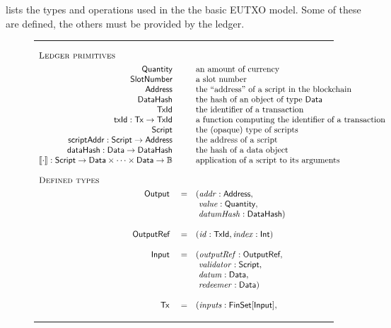 \documentclass[a4paper]{article}
\newcommand{\s}{\textsf}  %
\newcommand{\msf}[1]{\ensuremath{\mathsf{#1}}}
\newcommand{\mi}[1]{\ensuremath{\mathit{#1}}}
\newcommand\rfskip{7pt}
\newenvironment{ruledfigure}[1]{\begin{figure}[#1]\hrule\vspace{\rfskip}}{\vspace{\rfskip}\hrule\end{figure}}
\newcommand{\FinSet}[1]{\ensuremath{\s{FinSet}[#1]}}
\newcommand{\script}{\ensuremath{\s{Script}}}
\newcommand{\scriptAddr}{\msf{scriptAddr}}
\newcommand{\TxId}{\ensuremath{\s{TxId}}}
\newcommand{\txId}{\msf{txId}}
\newcommand{\txrefid}{\mi{id}}
\newcommand{\Address}{\ensuremath{\s{Address}}}
\newcommand{\DataHash}{\ensuremath{\s{DataHash}}}
\newcommand{\hashData}{\msf{dataHash}}
\newcommand{\idx}{\mi{index}}
\newcommand{\inputs}{\mi{inputs}}
\newcommand{\addr}{\mi{addr}}
\newcommand{\val}{\mi{value}}  %
\newcommand{\validator}{\mi{validator}}
\newcommand{\redeemer}{\mi{redeemer}}
\newcommand{\datum}{\mi{datum}}
\newcommand{\datumHash}{\mi{datumHash}}
\newcommand{\Data}{\ensuremath{\s{Data}}}
\newcommand{\outputref}{\mi{outputRef}}
\newcommand{\slotnum}{\ensuremath{\s{SlotNumber}}}
\newcommand{\eutxotx}{\msf{Tx}}
\newcommand{\qty}{\ensuremath{\s{Quantity}}}
\newcommand{\applyScript}[1]{\ensuremath{\llbracket#1\rrbracket}}
\newcommand\B{\ensuremath{\mathbb{B}}}
\begin{document}
 lists the types and operations used in the
the basic EUTXO model. Some of these are defined, the others must be provided by
the ledger.
\begin{ruledfigure}{H}
  \begin{displaymath}
  \begin{array}{rll}
    \multicolumn{3}{l}{\textsc{Ledger primitives}}\\[4pt]
    \qty{} && \mbox{an amount of currency}\\
    \slotnum && \mbox{a slot number}\\
    \Address && \mbox{the ``address'' of a script in the blockchain}\\
    \DataHash && \mbox{the hash of an object of type \Data{}}\\
    \TxId && \mbox{the identifier of a transaction}\\
    \txId : \eutxotx \rightarrow \TxId && \mbox{a function computing the identifier of a transaction}\\
    \script && \mbox{the (opaque) type of scripts}\\
    \scriptAddr : \script \rightarrow \Address && \mbox{the address of a script}\\
    \hashData : \Data \rightarrow \DataHash && \mbox{the hash of a data object}\\
    \applyScript{\cdot}: \script \rightarrow \Data \times \cdots \times
    \Data \rightarrow \B && \mbox{application of a script to its arguments}\\
    \\
    \multicolumn{3}{l}{\textsc{Defined types}}\\[4pt]
    \s{Output } &=&(\addr: \Address,\\
                & &\ \val: \qty,\\
                & &\ \datumHash: \DataHash)\\
    \\
    \s{OutputRef } &=&(\txrefid: \TxId, \idx: \s{Int})\\
    \\
    \s{Input } &=&(\outputref: \s{OutputRef},\\
               & &\ \validator: \script,\\
               & &\ \datum: \Data,\\
               & &\ \redeemer: \Data)\\
     \\
     \eutxotx\s{ } &=&(\inputs: \FinSet{\s{Input}},\\

\end{array}
\end{displaymath}
\end{ruledfigure}
\end{document}
